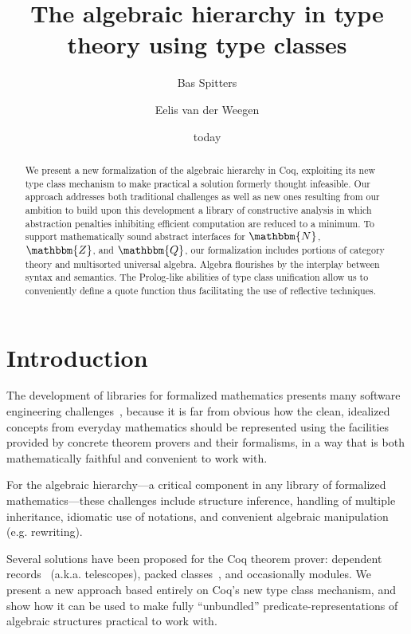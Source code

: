 \documentclass[a4paper,10pt,runningheads]{llncs}
\newcommand{\N}{\ensuremath{\mathbbm{N}}}
\newcommand{\Z}{\ensuremath{\mathbbm{Z}}}
\newcommand{\Q}{\ensuremath{\mathbbm{Q}}}
\begin{document}
\title{The algebraic hierarchy in type theory using type classes}
\author{Bas Spitters \and Eelis van der Weegen}
\date{today}
\maketitle
\begin{abstract}
We present a new formalization of the algebraic hierarchy in Coq, exploiting its new type class mechanism to make practical a solution formerly thought infeasible. Our approach addresses both traditional challenges as well as new ones resulting from our ambition to build upon this development a library of constructive analysis in which abstraction penalties inhibiting efficient computation are reduced to a minimum. To support mathematically sound abstract interfaces for $\N$, $\Z$, and $\Q$, our formalization includes portions of category theory and multisorted universal algebra.
Algebra flourishes by the interplay between syntax and semantics. The Prolog-like
abilities of type class unification allow us to conveniently define a quote function thus facilitating the use of reflective techniques.
\end{abstract}

\section{Introduction}
The development of libraries for formalized mathematics presents many software engineering challenges~\cite{C-corn,DBLP:conf/types/HaftmannW08}, because it is far from obvious how the clean, idealized concepts from everyday mathematics should be represented using the facilities provided by concrete theorem provers and their formalisms, in a way that is both mathematically faithful and convenient to work with.

For the algebraic hierarchy---a critical component in any library of formalized mathematics---these challenges include structure inference, handling of multiple inheritance, idiomatic use of notations, and convenient algebraic manipulation (e.g. rewriting).

Several solutions have been proposed for the Coq theorem prover: dependent records~\cite{DBLP:journals/jsc/GeuversPWZ02} (a.k.a. telescopes), packed classes~\cite{Packed}, and occasionally modules. We present a new approach based entirely on Coq's new type class mechanism, and show how it can be used to make fully ``unbundled'' predicate-representations of algebraic structures practical to work with.
\end{document}

